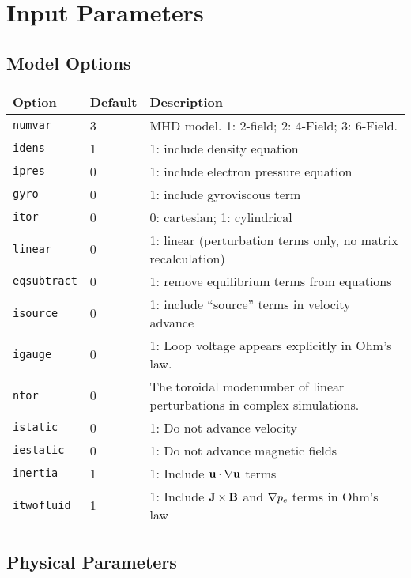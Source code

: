 \section{Input Parameters}
\label{sec:input_parameters}
\subsection{Model Options}

\begin{tabular}{llp{3in}}
  \textbf{Option}&\textbf{Default}&\textbf{Description}\\
  \hline
  \texttt{numvar} & 3   & MHD model. 1: 2-field;  2: 4-Field;  3: 6-Field.\\
  \texttt{idens}  & 1   & 1: include density equation\\
  \texttt{ipres}  & 0   & 1: include electron pressure equation\\
  \texttt{gyro}   & 0   & 1: include gyroviscous term\\
  \texttt{itor}   & 0   & 0: cartesian; 1: cylindrical\\
  \texttt{linear} & 0   & 1: linear (perturbation terms only, no matrix
                              recalculation)\\
  \texttt{eqsubtract}& 0& 1: remove equilibrium terms from equations\\
  \texttt{isource}   & 0& 1: include ``source'' terms in velocity
    advance\\
  \texttt{igauge} & 0   & 1: Loop voltage appears explicitly in Ohm's law.\\
  \texttt{ntor}   & 0   & The toroidal modenumber of linear perturbations in
                          complex simulations.\\
  \texttt{istatic}& 0   & 1: Do not advance velocity\\
  \texttt{iestatic}&0   & 1: Do not advance magnetic fields\\
  \texttt{inertia} & 1  & 1: Include $\mathbf{u} \cdot \nabla \mathbf{u}$ terms\\
  \texttt{itwofluid}& 1 & 1: Include $\mathbf{J}\times\mathbf{B}$ and
  $\nabla p_e$ terms in Ohm's law\\ 
\end{tabular}


\subsection{Physical Parameters}

